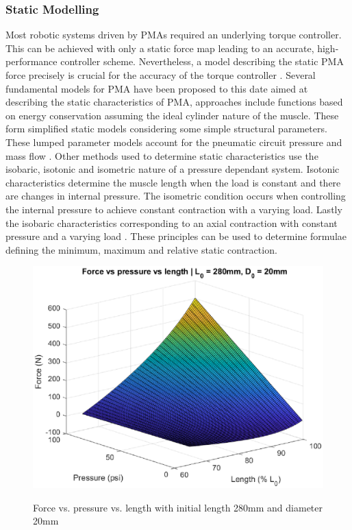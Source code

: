 \documentclass[11pt,a4paper]{article}
\begin{document}
\subsubsection{Static Modelling}
\label{sub:static_modelling}
Most robotic systems driven by PMAs required an underlying torque controller. This can be achieved with only a static force map leading to an accurate, high-performance controller scheme. Nevertheless, a model describing the static PMA force precisely is crucial for the accuracy of the torque controller \cite{martens_boblan_2017}. Several fundamental models for PMA have been proposed to this date aimed at describing the static characteristics of PMA, approaches include functions based on energy conservation assuming the ideal cylinder nature of the muscle. These form simplified static models considering some simple structural parameters. These lumped parameter models account for the pneumatic circuit pressure and mass flow \cite{chou_hannaford_1996}. Other methods used to determine static characteristics use the isobaric, isotonic and isometric nature of a pressure dependant system. Isotonic characteristics determine the muscle length when the load is constant and there are changes in internal pressure. The isometric condition occurs when controlling the internal pressure to achieve constant contraction with a varying load. Lastly the isobaric characteristics corresponding to an axial contraction with constant pressure and a varying load \cite{takosoglu_laski_blasiak_bracha_pietrala_2016}. These principles can be used to determine formulae defining the minimum, maximum and relative static contraction. \newline

\begin{figure}[hbt!]
    \centering
    \caption{Force vs. pressure vs. length with initial length 280mm and diameter 20mm}
    \includegraphics[scale=0.6]{staticmap.eps}
    \label{fig:staticmap}
\end{figure}
\end{document}
